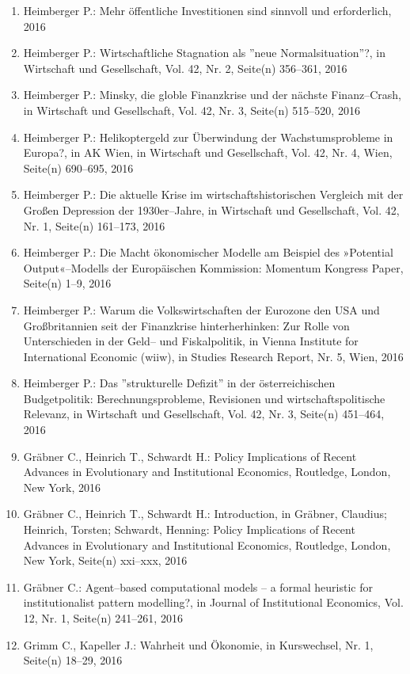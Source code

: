 \begin{enumerate}
	 \item Heimberger P.: Mehr öffentliche Investitionen sind sinnvoll und erforderlich, 2016
	 \item Heimberger P.: Wirtschaftliche Stagnation als ''neue Normalsituation''?, in Wirtschaft und Gesellschaft, Vol. 42, Nr. 2, Seite(n) 356--361, 2016
	 \item Heimberger P.: Minsky, die globle Finanzkrise und der nächste Finanz--Crash, in Wirtschaft und Gesellschaft, Vol. 42, Nr. 3, Seite(n) 515--520, 2016
	 \item Heimberger P.: Helikoptergeld zur Überwindung der Wachstumsprobleme in Europa?, in AK Wien, in Wirtschaft und Gesellschaft, Vol. 42, Nr. 4, Wien, Seite(n) 690--695, 2016
	 \item Heimberger P.: Die aktuelle Krise im wirtschaftshistorischen Vergleich mit der Großen Depression der 1930er--Jahre, in Wirtschaft und Gesellschaft, Vol. 42, Nr. 1, Seite(n) 161--173, 2016
	 \item Heimberger P.: Die Macht ökonomischer Modelle am Beispiel des »Potential Output«--Modells der Europäischen Kommission: Momentum Kongress Paper, Seite(n) 1--9, 2016
	 \item Heimberger P.: Warum die Volkswirtschaften der Eurozone den USA und Großbritannien seit der Finanzkrise hinterherhinken: Zur Rolle von Unterschieden in der Geld– und Fiskalpolitik, in Vienna Institute for International Economic (wiiw), in Studies Research Report, Nr. 5, Wien, 2016
	 \item Heimberger P.: Das ''strukturelle Defizit'' in der österreichischen Budgetpolitik: Berechnungsprobleme, Revisionen und wirtschaftspolitische Relevanz, in Wirtschaft und Gesellschaft, Vol. 42, Nr. 3, Seite(n) 451--464, 2016
	 \item Gräbner C., Heinrich T., Schwardt H.: Policy Implications of Recent Advances in Evolutionary and Institutional Economics, Routledge, London, New York, 2016
	 \item Gräbner C., Heinrich T., Schwardt H.: Introduction, in Gräbner, Claudius; Heinrich, Torsten; Schwardt, Henning: Policy Implications of Recent Advances in Evolutionary and Institutional Economics, Routledge, London, New York, Seite(n) xxi--xxx, 2016
	 \item Gräbner C.: Agent--based computational models -- a formal heuristic for institutionalist pattern modelling?, in Journal of Institutional Economics, Vol. 12, Nr. 1, Seite(n) 241--261, 2016
	 \item Grimm C., Kapeller J.: Wahrheit und Ökonomie, in Kurswechsel, Nr. 1, Seite(n) 18--29, 2016

\end{enumerate}
